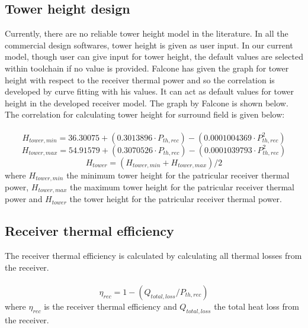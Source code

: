 \subsection{Tower height design}
Currently, there are no reliable tower height model in the literature. In all the commercial design softwares, tower height is given as user input. In our current model, though user can give input for tower height, the default values are selected within toolchain if no value is provided. Falcone has given the graph for tower height with respect to the receiver thermal power and so the correlation is developed by curve fitting with his values. It can act as default values for tower height in the developed receiver model. The graph by Falcone is shown below. The correlation for calculating tower height for surround field is given below:\\\\
\begin{equation}
	H_{tower,min} = 36.30075 + (0.3013896 \cdot P_{th,rec}) - (0.0001004369 \cdot P_{th,rec}^2)
\end{equation}
\begin{equation}
	H_{tower,max}= 54.91579 + (0.3070526 \cdot P_{th,rec}) - (0.0001039793 \cdot P_{th,rec}^2)
\end{equation}       
\begin{equation}
	H_{tower} = (H_{tower,min} + H_{tower,max}) / 2
\end{equation}
where $H_{tower,min}$ the minimum tower height for the patricular receiver thermal power, $H_{tower,max}$ the maximum tower height for the patricular receiver thermal power and $H_{tower}$ the tower height for the patricular receiver thermal power.

\subsection{Receiver thermal efficiency}
The receiver thermal efficiency is calculated by calculating all thermal losses from the receiver.\\\\
\begin{equation}
	\eta_{rec} = 1 - (Q_{total,loss} / P_{th,rec})
\end{equation}
where $\eta_{rec}$ is the receiver thermal efficiency and $Q_{total,loss}$ the total heat loss from the receiver.


